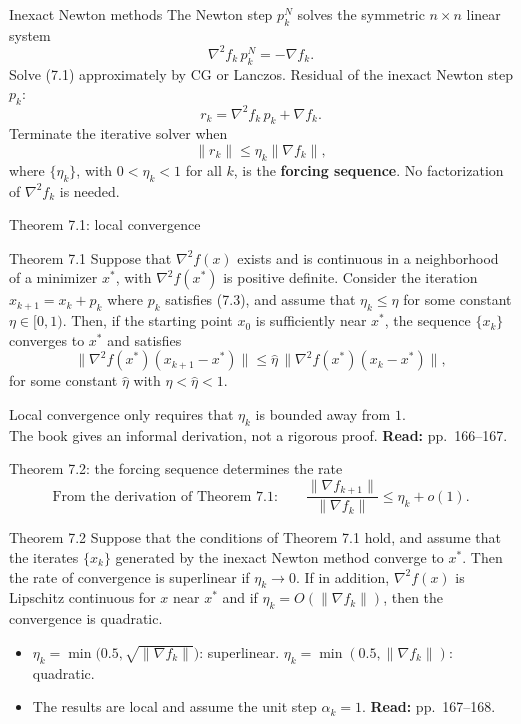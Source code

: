 \documentclass[aspectratio=169,12pt]{beamer}
\newcommand{\xs}{x^{*}}
\newcommand{\gradf}{\nabla f}
\newcommand{\hessf}{\nabla^{2} f}
\newcommand{\readbook}[1]{{\color{red}\textbf{Read:} #1}}
\begin{document}
\begin{frame}{Inexact Newton methods}
  The Newton step $p_{k}^{N}$ solves the symmetric $n\times n$ linear system
  \[ \hessf_{k}\,p_{k}^{N}=-\gradf_{k} . \tag{7.1} \]
  Solve (7.1) approximately by CG or Lanczos. Residual of the inexact Newton step $p_{k}$:
  \[ r_{k}=\hessf_{k}\,p_{k}+\gradf_{k} . \tag{7.2} \]
  Terminate the iterative solver when
  \[ \|r_{k}\|\le\eta_{k}\|\gradf_{k}\| , \tag{7.3} \]
  where $\{\eta_{k}\}$, with $0<\eta_{k}<1$ for all $k$, is the \textbf{forcing sequence}.
  No factorization of $\hessf_{k}$ is needed.
\end{frame}

\begin{frame}{Theorem 7.1: local convergence}
  \begin{block}{Theorem 7.1}
    Suppose that $\hessf(x)$ exists and is continuous in a neighborhood of a minimizer $\xs$,
    with $\hessf(\xs)$ is positive definite. Consider the iteration $x_{k+1}=x_{k}+p_{k}$ where
    $p_{k}$ satisfies (7.3), and assume that $\eta_{k}\le\eta$ for some constant $\eta\in[0,1)$.
    Then, if the starting point $x_{0}$ is sufficiently near $\xs$, the sequence $\{x_{k}\}$
    converges to $\xs$ and satisfies
    \[ \|\hessf(\xs)(x_{k+1}-\xs)\|\le\hat\eta\,\|\hessf(\xs)(x_{k}-\xs)\| , \tag{7.4} \]
    for some constant $\hat\eta$ with $\eta<\hat\eta<1$.
  \end{block}

  Local convergence only requires that $\eta_{k}$ is bounded away from $1$.\\
  The book gives an informal derivation, not a rigorous proof. \readbook{pp.~166--167.}
\end{frame}

\begin{frame}{Theorem 7.2: the forcing sequence determines the rate}
  \[
    \text{From the derivation of Theorem 7.1:}\qquad
    \frac{\|\gradf_{k+1}\|}{\|\gradf_{k}\|}\le\eta_{k}+o(1) .
    \tag{7.8}
  \]

  \begin{block}{Theorem 7.2}
    Suppose that the conditions of Theorem 7.1 hold, and assume that the iterates $\{x_{k}\}$
    generated by the inexact Newton method converge to $\xs$. Then the rate of convergence
    is superlinear if $\eta_{k}\to 0$. If in addition, $\hessf(x)$ is Lipschitz continuous for $x$
    near $\xs$ and if $\eta_{k}=O(\|\gradf_{k}\|)$, then the convergence is quadratic.
  \end{block}

  \begin{itemize}\setlength\itemsep{0.25em}
    \item $\eta_{k}=\min\big(0.5,\sqrt{\|\gradf_{k}\|}\big)$: superlinear.\quad
      $\eta_{k}=\min(0.5,\|\gradf_{k}\|)$: quadratic.
    \item The results are local and assume the unit step $\alpha_{k}=1$.
      \readbook{pp.~167--168.}
  \end{itemize}
\end{frame}
\end{document}
